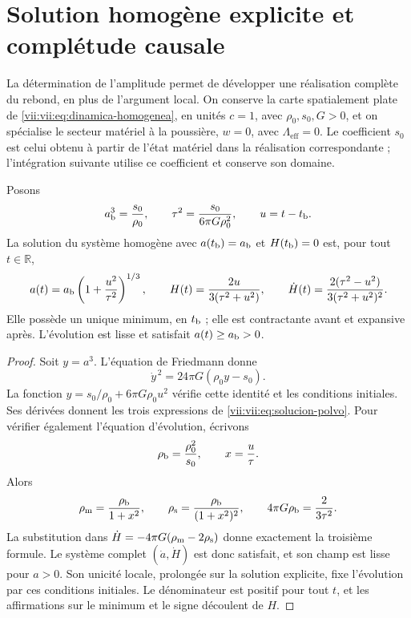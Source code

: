 \section{Solution homogène explicite et complétude causale}
\label{vii:vii:sec:solucion-homogenea}
La détermination de l'amplitude permet de développer une réalisation
complète du rebond, en plus de l'argument local. On conserve la carte
spatialement plate de \eqref{vii:vii:eq:dinamica-homogenea}, en unités
\(c=1\), avec \(\rho_0,s_0,G>0\), et on spécialise le secteur matériel
à la poussière, \(w=0\), avec \(\Lambda_{\mathrm{eff}}=0\).
Le coefficient \(s_0\) est celui obtenu à partir de l'état
matériel dans la réalisation correspondante ; l'intégration suivante
utilise ce coefficient et conserve son domaine.

\begin{theorem}
\label{vii:vii:thm:rebote-polvo}
Posons
\[
 a_{\rm b}^3=\frac{s_0}{\rho_0},\qquad
 \tau^2=\frac{s_0}{6\pi G\rho_0^2},\qquad u=t-t_{\rm b}.
\]
La solution du système homogène avec
\(a(t_{\rm b})=a_{\rm b}\) et \(H(t_{\rm b})=0\) est, pour tout
\(t\in\mathbb R\),
\begin{equation}
 a(t)=a_{\rm b}\left(1+\frac{u^2}{\tau^2}\right)^{1/3},
 \qquad H(t)=\frac{2u}{3(\tau^2+u^2)},\qquad
 \dot H(t)=\frac{2(\tau^2-u^2)}{3(\tau^2+u^2)^2}.
 \label{vii:vii:eq:solucion-polvo}
\end{equation}
Elle possède un unique minimum, en \(t_{\rm b}\) ; elle est contractante avant et expansive après. L'évolution est lisse et satisfait \(a(t)\geq a_{\rm b}>0\).
\end{theorem}
\begin{proof}
Soit \(y=a^3\). L'équation de Friedmann donne
\[
 \dot y^{\,2}=24\pi G(\rho_0y-s_0).
\]
La fonction \(y=s_0/\rho_0+6\pi G\rho_0u^2\) vérifie cette
identité et les conditions initiales. Ses dérivées donnent les
trois expressions de \eqref{vii:vii:eq:solucion-polvo}. Pour vérifier
également l'équation d'évolution, écrivons
\[
 \rho_{\rm b}=\frac{\rho_0^2}{s_0},\qquad
 x=\frac{u}{\tau}.
\]
Alors
\[
 \rho_{\rm m}=\frac{\rho_{\rm b}}{1+x^2},\qquad
 \rho_{\rm s}=\frac{\rho_{\rm b}}{(1+x^2)^2},\qquad
 4\pi G\rho_{\rm b}=\frac{2}{3\tau^2}.
\]
La substitution dans \(\dot H=-4\pi G(\rho_{\rm m}-2\rho_{\rm s})\) donne exactement la troisième formule. Le système complet \((\dot a,\dot H)\) est donc satisfait, et son champ est lisse pour \(a>0\). Son unicité locale, prolongée sur la solution explicite, fixe l'évolution par ces conditions initiales. Le dénominateur est positif pour tout \(t\), et les affirmations sur le minimum et le signe découlent de \(H\).
\end{proof}

